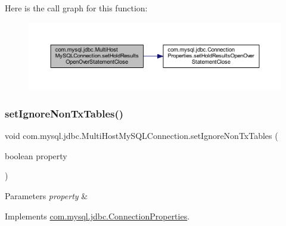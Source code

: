 Here is the call graph for this function\+:
\nopagebreak
\begin{figure}[H]
\begin{center}
\leavevmode
\includegraphics[width=350pt]{classcom_1_1mysql_1_1jdbc_1_1_multi_host_my_s_q_l_connection_a12b7bd6460f769ac0ef7b34c7fbc9808_cgraph}
\end{center}
\end{figure}
\mbox{\label{classcom_1_1mysql_1_1jdbc_1_1_multi_host_my_s_q_l_connection_a027ef854c24322fe98bd80b458cb82d0}} 
\subsubsection{\texorpdfstring{set\+Ignore\+Non\+Tx\+Tables()}{setIgnoreNonTxTables()}}
{\footnotesize\ttfamily void com.\+mysql.\+jdbc.\+Multi\+Host\+My\+S\+Q\+L\+Connection.\+set\+Ignore\+Non\+Tx\+Tables (\begin{DoxyParamCaption}\item[{boolean}]{property }\end{DoxyParamCaption})}


\begin{DoxyParams}{Parameters}
{\em property} & \\
\hline
\end{DoxyParams}


Implements \mbox{\hyperlink{interfacecom_1_1mysql_1_1jdbc_1_1_connection_properties_aef7c4c2447c9875392d6dff3452d9ac2}{com.\+mysql.\+jdbc.\+Connection\+Properties}}.

